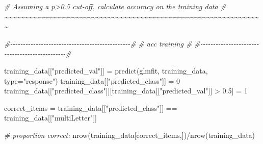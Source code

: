 \documentclass[
]{article}
\newenvironment{Shaded}{\begin{snugshade}}{\end{snugshade}}
\newcommand{\AttributeTok}[1]{\textcolor[rgb]{0.77,0.63,0.00}{#1}}
\newcommand{\CommentTok}[1]{\textcolor[rgb]{0.56,0.35,0.01}{\textit{#1}}}
\newcommand{\DecValTok}[1]{\textcolor[rgb]{0.00,0.00,0.81}{#1}}
\newcommand{\FloatTok}[1]{\textcolor[rgb]{0.00,0.00,0.81}{#1}}
\newcommand{\FunctionTok}[1]{\textcolor[rgb]{0.00,0.00,0.00}{#1}}
\newcommand{\NormalTok}[1]{#1}
\newcommand{\OtherTok}[1]{\textcolor[rgb]{0.56,0.35,0.01}{#1}}
\newcommand{\SpecialCharTok}[1]{\textcolor[rgb]{0.00,0.00,0.00}{#1}}
\newcommand{\StringTok}[1]{\textcolor[rgb]{0.31,0.60,0.02}{#1}}
\begin{document}
\begin{Shaded}
\begin{Highlighting}[]
\CommentTok{\# Assuming a p\textgreater{}0.5 cut{-}off, calculate accuracy on the training data}
\CommentTok{\# \textasciitilde{}\textasciitilde{}\textasciitilde{}\textasciitilde{}\textasciitilde{}\textasciitilde{}\textasciitilde{}\textasciitilde{}\textasciitilde{}\textasciitilde{}\textasciitilde{}\textasciitilde{}\textasciitilde{}\textasciitilde{}\textasciitilde{}\textasciitilde{}\textasciitilde{}\textasciitilde{}\textasciitilde{}\textasciitilde{}\textasciitilde{}\textasciitilde{}\textasciitilde{}\textasciitilde{}\textasciitilde{}\textasciitilde{}\textasciitilde{}\textasciitilde{}\textasciitilde{}\textasciitilde{}\textasciitilde{}\textasciitilde{}\textasciitilde{}\textasciitilde{}\textasciitilde{}\textasciitilde{}\textasciitilde{}\textasciitilde{}\textasciitilde{}\textasciitilde{}\textasciitilde{}\textasciitilde{}\textasciitilde{}\textasciitilde{}\textasciitilde{}\textasciitilde{}\textasciitilde{}\textasciitilde{}\textasciitilde{}\textasciitilde{}\textasciitilde{}\textasciitilde{}\textasciitilde{}\textasciitilde{}\textasciitilde{}\textasciitilde{}\textasciitilde{}\textasciitilde{}\textasciitilde{}\textasciitilde{}\textasciitilde{}\textasciitilde{}\textasciitilde{}\textasciitilde{}\textasciitilde{}}

\CommentTok{\#{-}{-}{-}{-}{-}{-}{-}{-}{-}{-}{-}{-}{-}{-}{-}{-}{-}{-}{-}{-}{-}{-}{-}{-}{-}{-}{-}{-}{-}{-}{-}{-}{-}{-}{-}{-}{-}{-}{-}{-}{-}{-}{-}{-}{-}{-}{-}\#}
\CommentTok{\#             acc training                       \#}
\CommentTok{\#{-}{-}{-}{-}{-}{-}{-}{-}{-}{-}{-}{-}{-}{-}{-}{-}{-}{-}{-}{-}{-}{-}{-}{-}{-}{-}{-}{-}{-}{-}{-}{-}{-}{-}{-}{-}{-}{-}{-}{-}{-}{-}{-}{-}{-}{-}{-}\#}

\NormalTok{training\_data[[}\StringTok{"predicted\_val"}\NormalTok{]] }\OtherTok{=} \FunctionTok{predict}\NormalTok{(glmfit, training\_data, }\AttributeTok{type=}\StringTok{"response"}\NormalTok{)}
\NormalTok{training\_data[[}\StringTok{"predicted\_class"}\NormalTok{]] }\OtherTok{=} \DecValTok{0}
\NormalTok{training\_data[[}\StringTok{"predicted\_class"}\NormalTok{]][training\_data[[}\StringTok{"predicted\_val"}\NormalTok{]] }\SpecialCharTok{\textgreater{}} \FloatTok{0.5}\NormalTok{] }\OtherTok{=} \DecValTok{1}



\NormalTok{correct\_items }\OtherTok{=}\NormalTok{ training\_data[[}\StringTok{"predicted\_class"}\NormalTok{]] }\SpecialCharTok{==}\NormalTok{ training\_data[[}\StringTok{"multiLetter"}\NormalTok{]] }


\CommentTok{\# proportion correct:}
\FunctionTok{nrow}\NormalTok{(training\_data[correct\_items,])}\SpecialCharTok{/}\FunctionTok{nrow}\NormalTok{(training\_data)}
\end{Highlighting}
\end{Shaded}
\end{document}
